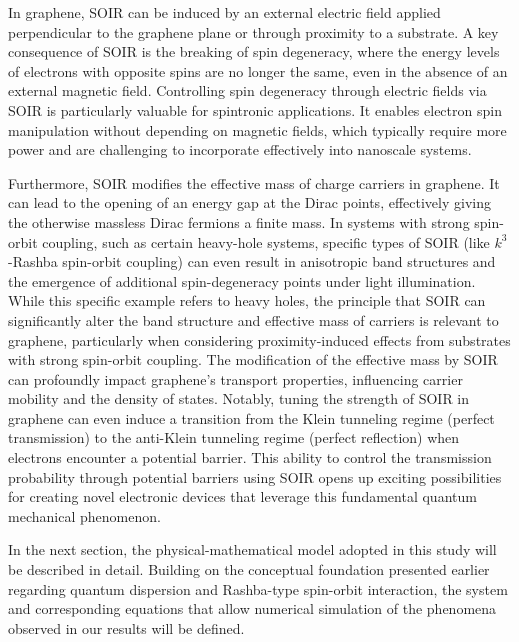 In graphene, SOIR can be induced by an external electric field applied perpendicular to the graphene plane or through proximity to a substrate\cite{ShcherbakovSciAdv2021}.
A key consequence of SOIR is the breaking of spin degeneracy, where the energy levels of electrons with opposite spins are no longer the same, even in the absence of an external magnetic field\cite{DelkhoshPhysE2015}.
Controlling spin degeneracy through electric fields via SOIR is particularly valuable for spintronic applications.
It enables electron spin manipulation without depending on magnetic fields, which typically require more power and are challenging to incorporate effectively into nanoscale systems.


Furthermore, SOIR modifies the effective mass of charge carriers in graphene\cite{WangPhysRevX2016}.
It can lead to the opening of an energy gap at the Dirac points, effectively giving the otherwise massless Dirac fermions a finite mass.
In systems with strong spin-orbit coupling, such as certain heavy-hole systems, specific types of SOIR (like $k^3$-Rashba spin-orbit coupling) can even result in anisotropic band structures and the emergence of additional spin-degeneracy points under light illumination\cite{DellAnnaJPhysCondMatt2018, AvishaiPhysRevB2021}.
While this specific example refers to heavy holes, the principle that SOIR can significantly alter the band structure and effective mass of carriers is relevant to graphene, particularly when considering proximity-induced effects from substrates with strong spin-orbit coupling\cite{GindikinPhysRevB2025}.
The modification of the effective mass by SOIR can profoundly impact graphene's transport properties, influencing carrier mobility and the density of states.
Notably, tuning the strength of SOIR in graphene can even induce a transition from the Klein tunneling regime (perfect transmission) to the anti-Klein tunneling regime (perfect reflection) when electrons encounter a potential barrier.
This ability to control the transmission probability through potential barriers using SOIR opens up exciting possibilities for creating novel electronic devices that leverage this fundamental quantum mechanical phenomenon\cite{YaoMater2024}.

In the next section, the physical-mathematical model adopted in this study will be described in detail.
Building on the conceptual foundation presented earlier regarding quantum dispersion and Rashba-type spin-orbit interaction, the system and corresponding equations that allow numerical simulation of the phenomena observed in our results will be defined.


